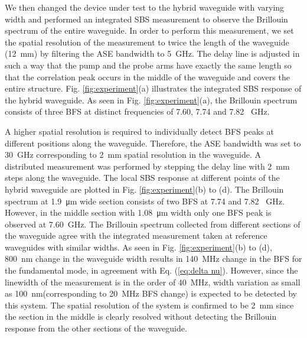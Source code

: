 \documentclass[superscriptaddress, nofootinbib, twocolumn, amsmath,amssymb, aps, pra, notitlepage, longbibliography]{revtex4-1}
\begin{document}
We then changed the device under test to the hybrid waveguide with varying width and performed an integrated SBS measurement to observe the Brillouin spectrum of the entire waveguide. In order to perform this measurement, we set the spatial resolution of the measurement to twice the length of the waveguide (\SI{12}{\mm}) by filtering the ASE bandwidth to \SI{5}{\GHz}. The delay line is adjusted in such a way that the pump and the probe arms have exactly the same length so that the correlation peak occurs in the middle of the waveguide and covers the entire structure. Fig. \ref{fig:experiment}(a) illustrates the integrated SBS response of the hybrid waveguide. As seen in Fig. \ref{fig:experiment}(a), the Brillouin spectrum consists of three BFS at distinct frequencies of 7.60, 7.74 and 7.82 \SI{}{\GHz}.

 A higher spatial resolution is required to individually detect BFS peaks at different positions along the waveguide. Therefore, the ASE bandwidth was set to \SI{30}{\GHz} corresponding to \SI{2}{\mm} spatial resolution in the waveguide. A distributed measurement was performed by stepping the delay line with \SI{2}{\mm} steps along the waveguide. The local SBS response at different points of the hybrid waveguide are plotted in Fig. \ref{fig:experiment}(b) to (d). The Brillouin spectrum at \SI{1.9}{\um} wide section consists of two BFS at 7.74 and 7.82 \SI{}{\GHz}. However, in the middle section with \SI{1.08}{\um} width only one BFS peak is observed at \SI{7.60}{\GHz}. The Brillouin spectrum collected from different sections of the waveguide agree with the integrated measurement taken at reference waveguides with similar widths. 
 As seen in Fig. \ref{fig:experiment}(b) to (d), \SI{800}{\nm} change in the waveguide width results in \SI{140}{\MHz} change in the BFS for the fundamental mode, in agreement with Eq. (\ref{eq:delta nu}). However, since the linewidth of the measurement is in the order of \SI{40}{\MHz}, width variation as small as \SI{100}{\nm}(corresponding to \SI{20}{\MHz} BFS change) is expected to be detected by this system.
 The spatial resolution of the system is confirmed to be \SI{2}{\mm} since the section in the middle is clearly resolved without detecting the Brillouin response from the other sections of the waveguide.


\end{document}
